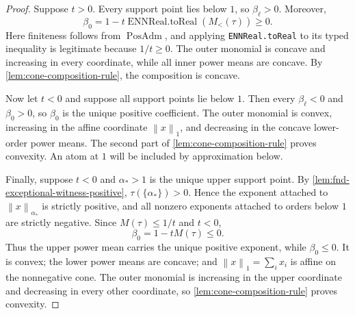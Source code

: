 \documentclass[9pt]{extarticle}
\theoremstyle{definition}
\theoremstyle{remark}
\newcommand{\norm}[1]{\left\lVert #1\right\rVert}
\begin{document}
\begin{proof}
Suppose $t>0$. Every support point lies below $1$, so
$\beta_\ell>0$. Moreover,
\[
 \beta_0=1-t\operatorname{ENNReal.toReal}(M_{<}(\tau))\geq0.
\]
Here finiteness follows from $\operatorname{PosAdm}$, and applying
\texttt{ENNReal.toReal} to its typed inequality is legitimate because
$1/t\geq0$.
The outer monomial is concave and increasing in every coordinate, while all
inner power means are concave. By \cref{lem:cone-composition-rule}, the
composition is concave.

Now let $t<0$ and suppose all support points lie below $1$. Then every
$\beta_\ell<0$ and $\beta_0>0$, so $\beta_0$ is the unique positive
coefficient. The outer monomial is convex, increasing in the affine
coordinate $\norm{x}_1$, and decreasing in the concave lower-order power
means. The second part of \cref{lem:cone-composition-rule} proves convexity. An
atom at $1$ will be included by approximation below.

Finally, suppose $t<0$ and $\alpha_*>1$ is the unique upper support point.
By \cref{lem:fnd-exceptional-witness-positive},
$\tau(\{\alpha_*\})>0$.  Hence the exponent attached to
$\norm{x}_{\alpha_*}$ is strictly positive, and all nonzero exponents
attached to orders below $1$ are strictly negative. Since
$M(\tau)\leq1/t$ and $t<0$,
\[
 \beta_0=1-tM(\tau)\leq0.
\]
Thus the upper power mean carries the unique positive exponent, while
$\beta_0\leq0$. It is convex;
the lower power means are concave; and $\norm{x}_1=\sum_i x_i$ is affine on
the nonnegative cone. The outer
monomial is increasing in the upper coordinate and decreasing in every other
coordinate, so \cref{lem:cone-composition-rule} proves convexity.


\end{proof}
\end{document}
